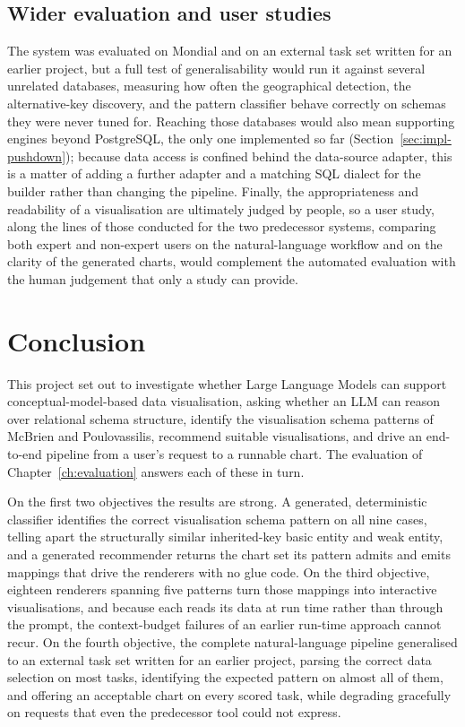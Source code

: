\section{Wider evaluation and user studies}
\label{sec:future-engines}

The system was evaluated on Mondial and on an external task set written for an earlier project, but a full test of generalisability would run it against several unrelated databases, measuring how often the geographical detection, the alternative-key discovery, and the pattern classifier behave correctly on schemas they were never tuned for. Reaching those databases would also mean supporting engines beyond PostgreSQL, the only one implemented so far (Section~\ref{sec:impl-pushdown}); because data access is confined behind the data-source adapter, this is a matter of adding a further adapter and a matching SQL dialect for the builder rather than changing the pipeline. Finally, the appropriateness and readability of a visualisation are ultimately judged by people, so a user study, along the lines of those conducted for the two predecessor systems, comparing both expert and non-expert users on the natural-language workflow and on the clarity of the generated charts, would complement the automated evaluation with the human judgement that only a study can provide.


\chapter{Conclusion}
\label{ch:conclusion}

This project set out to investigate whether Large Language Models can support conceptual-model-based data visualisation, asking whether an LLM can reason over relational schema structure, identify the visualisation schema patterns of McBrien and Poulovassilis, recommend suitable visualisations, and drive an end-to-end pipeline from a user's request to a runnable chart. The evaluation of Chapter~\ref{ch:evaluation} answers each of these in turn.

On the first two objectives the results are strong. A generated, deterministic classifier identifies the correct visualisation schema pattern on all nine cases, telling apart the structurally similar inherited-key basic entity and weak entity, and a generated recommender returns the chart set its pattern admits and emits mappings that drive the renderers with no glue code. On the third objective, eighteen renderers spanning five patterns turn those mappings into interactive visualisations, and because each reads its data at run time rather than through the prompt, the context-budget failures of an earlier run-time approach cannot recur. On the fourth objective, the complete natural-language pipeline generalised to an external task set written for an earlier project, parsing the correct data selection on most tasks, identifying the expected pattern on almost all of them, and offering an acceptable chart on every scored task, while degrading gracefully on requests that even the predecessor tool could not express.


